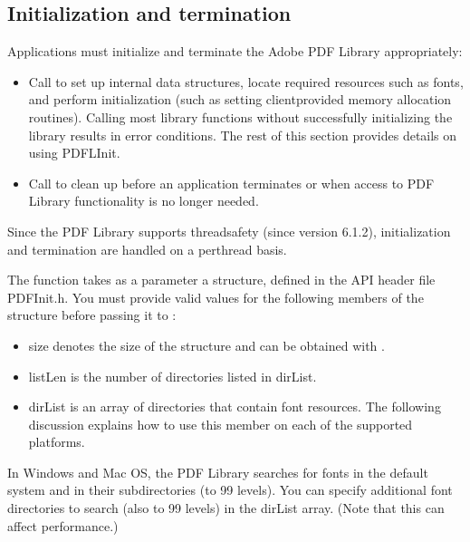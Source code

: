 \documentclass[letterpaper,12pt,english,openany,oneside]{sphinxmanual}
\begin{document}
\subsection{Initialization and termination}
\label{\detokenize{Plugins_CreatingSimplePlug:initialization-and-termination}}
Applications must initialize and terminate the Adobe PDF Library appropriately:
\begin{itemize}
\item {} 
Call  to set up internal data structures, locate required resources such as fonts, and perform initialization (such as setting client\sphinxhyphen{}provided memory allocation routines). Calling most library functions without successfully initializing the library results in error conditions. The rest of this section provides details on using PDFLInit.

\item {} 
Call  to clean up before an application terminates or when access to PDF Library functionality is no longer needed.

\end{itemize}

Since the PDF Library supports thread\sphinxhyphen{}safety (since version 6.1.2), initialization and termination are handled on a per\sphinxhyphen{}thread basis.

The  function takes as a parameter a  structure, defined in the API header file PDFInit.h. You must provide valid values for the following members of the structure before passing it to  :
\begin{itemize}
\item {} 
size denotes the size of the structure and can be obtained with .

\item {} 
listLen is the number of directories listed in dirList.

\item {} 
dirList is an array of directories that contain font resources. The following discussion explains how to use this member on each of the supported platforms.

\end{itemize}

In Windows and Mac OS, the PDF Library searches for fonts in the default system and in their subdirectories (to 99 levels). You can specify additional font directories to search (also to 99 levels) in the dirList array. (Note that this can affect performance.)
\end{document}
